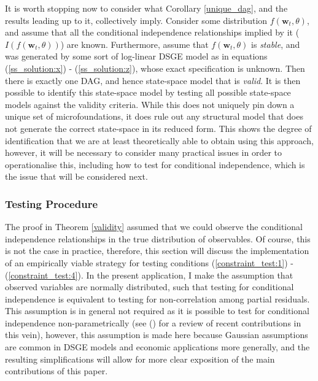 \documentclass{article}
\begin{document}
It is worth stopping now to consider what Corollary \ref{unique_dag}, and the results leading up to it, collectively imply. Consider some distribution $f(\mathbf{w}_t,\theta)$, and assume that all the conditional independence relationships implied by it ($I(f(\mathbf{w}_t,\theta))$) are known. Furthermore, assume that $f(\mathbf{w}_t,\theta)$ is \textit{stable}, and was generated by some sort of log-linear DSGE model as in equations (\ref{ss_solution:x}) - (\ref{ss_solution:z}), whose exact specification is unknown. Then there is exactly one DAG, and hence state-space model that is \textit{valid}. It is then possible to identify this state-space model by testing all possible state-space models against the validity criteria. While this does not uniquely pin down a unique set of microfoundations, it does rule out any structural model that does not generate the correct state-space in its reduced form. This shows the degree of identification that we are at least theoretically able to obtain using this approach, however, it will be necessary to consider many practical issues in order to operationalise this, including how to test for conditional independence, which is the issue that will be considered next.

\subsubsection{Testing Procedure} \label{testing}

The proof in Theorem \ref{validity} assumed that we could observe the conditional independence relationships in the true distribution of observables. Of course, this is not the case in practice, therefore, this section will discuss the implementation of an empirically viable strategy for testing conditions (\ref{constraint_test:1}) - (\ref{constraint_test:4}). In the present application, I make the assumption that observed variables are normally distributed, such that testing for conditional independence is equivalent to testing for non-correlation among partial residuals. This assumption is in general not required as it is possible to test for conditional independence non-parametrically (see \citeauthor{strobl2019approximate} (\citeyear{strobl2019approximate}) for a review of recent contributions in this vein), however, this assumption is made here because Gaussian assumptions are common in DSGE models and economic applications more generally, and the resulting simplifications will allow for more clear exposition of the main contributions of this paper. 
\end{document}
